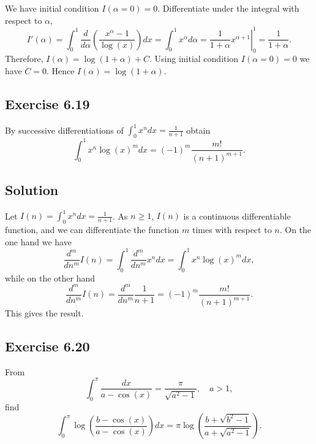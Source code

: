 We have initial condition $I(\alpha = 0) = 0$.
Differentiate under the integral with respect to $\alpha$,
\begin{equation*}
    I'(\alpha) = \int_0^1 \frac{d}{d\alpha} \left( \frac{x^{\alpha} - 1}{\log(x)} \right) dx
        = \int_0^1 x^{\alpha} d\alpha
        = \left. \frac{1}{1 + \alpha} x^{\alpha+1} \right|_0^1
        = \frac{1}{1 + \alpha}.
\end{equation*}
Therefore, $I(\alpha) = \log(1 + \alpha) + C$.
Using initial condition $I(\alpha = 0) = 0$ we have $C = 0$.
Hence $I(\alpha) = \log(1 + \alpha)$.


\subsection*{Exercise 6.19}

By successive differentiations of $\int_0^1 x^n dx = \frac{1}{n + 1}$ obtain
\begin{equation*}
    \int_0^1 x^n \log(x)^m dx = (-1)^m \frac{m!}{(n + 1)^{m + 1}}.
\end{equation*}

\subsection*{Solution}

Let $I(n) = \int_0^1 x^n dx = \frac{1}{n + 1}$.
As $n \geq 1$, $I(n)$ is a continuous differentiable function, and we can differentiate the function $m$ times with respect to $n$.
On the one hand we have
\begin{equation*}
    \frac{d^m}{dn^m} I(n) = \int_0^1 \frac{d^m}{dn^m} x^n dx = \int_0^1 x^n \log(x)^m dx,
\end{equation*}
while on the other hand
\begin{equation*}
    \frac{d^m}{dn^m} I(n) = \frac{d^m}{dn^m} \frac{1}{n + 1} = (-1)^m \frac{m!}{(n + 1)^{m + 1}}.
\end{equation*}
This gives the result.


\subsection*{Exercise 6.20}

From
\begin{equation*}
    \int_0^{\pi} \frac{dx}{a - \cos(x)} = \frac{\pi}{\sqrt{a^2 - 1}}, \quad a > 1,
\end{equation*}
find
\begin{equation*}
    \int_0^\pi \log\left(\frac{b - \cos(x)}{a - \cos(x)} \right) dx = \pi \log\left( \frac{b + \sqrt{b^2 - 1}}{a + \sqrt{a^2 - 1}} \right).
\end{equation*}

